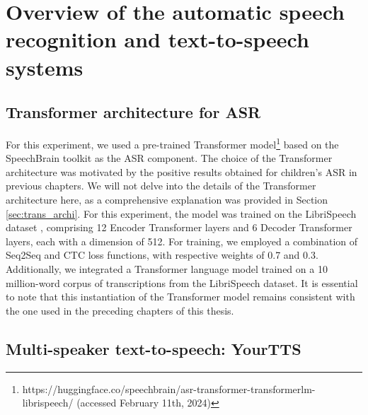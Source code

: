 \section{Overview of the automatic speech recognition and text-to-speech systems}
\label{section:SOA}
\subsection{Transformer architecture for ASR}

For this experiment, we used a pre-trained Transformer model\footnote{https://huggingface.co/speechbrain/asr-transformer-transformerlm-librispeech/ (accessed February 11th, 2024)} based on the SpeechBrain toolkit \cite{speechbrain} as the \ac{ASR} component. The choice of the Transformer architecture was motivated by the positive results obtained for children's \ac{ASR} in previous chapters. We will not delve into the details of the Transformer architecture here, as a comprehensive explanation was provided in Section \ref{sec:trans_archi}. For this experiment, the model was trained on the LibriSpeech dataset \cite{librispeech}, comprising 12 Encoder Transformer layers and 6 Decoder Transformer layers, each with a dimension of 512. For training, we employed a combination of \ac{Seq2Seq} and \ac{CTC} loss functions, with respective weights of 0.7 and 0.3. Additionally, we integrated a Transformer language model trained on a 10 million-word corpus of transcriptions from the LibriSpeech dataset.
It is essential to note that this instantiation of the Transformer model remains consistent with the one used in the preceding chapters of this thesis.


\subsection{Multi-speaker text-to-speech: YourTTS}


